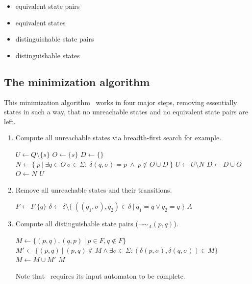 \begin{itemize}
	\item equivalent state pairs
	\item equivalent states
	\item distinguishable state pairs
	\item distinguishable states
\end{itemize}

\subsection{The minimization algorithm}

This minimization algorithm \MinAlg\ works in four major steps, removing essentially states in such a way, that no unreachable states and no equivalent state pairs are left.
\begin{enumerate}
	\item Compute all unreachable states via breadth-first search for example.
	
	\vspace{0.2cm}
	\begin{algorithmic}[1]
			\State $U \gets Q \setminus \{s\}$	
			\State $O \gets \{s\}$				
			\State $D \gets \{\}$				
				\State $N \gets \{\ p\ | \ \exists q \in O\ \sigma \in \Sigma \colon\ \delta(q, \sigma) = p\ \land\ p \notin O \cup D\ \}$
				\State $U \gets U \setminus N$
				\State $D \gets D \cup O$
				\State $O \gets N$
			\EndWhile
			\State \Return $U$
		\EndFunction
	\end{algorithmic}

	\item Remove all unreachable states and their transitions.
	
	\vspace{0.2cm}
	\begin{algorithmic}[1]
					\State $F \gets F \ \{q\}$
				\EndIf
				\State $\delta \gets \delta \setminus \{\ ((q_1, \sigma), q_2) \in \delta\ |\ q_1 = q \lor q_2 = q\ \}$
			\EndFor
			\State \Return $A$
		\EndFunction
	\end{algorithmic}

	\item Compute all distinguishable state pairs ($\neg \sim_A(p, q)$).
	
	\vspace{0.2cm}
	\begin{algorithmic}[1]
		 \label{ch:1:minmark}
		\State $M \gets \{ (p,q), (q,p)\ |\ p \in F, q \notin F \}$
		\Do
			\State $M' \gets \{ (p,q)\ |\ (p,q) \notin M \land \exists \sigma \in \Sigma \colon (\delta(p,\sigma), \delta(q,\sigma)) \in M \}$
			\State $M \gets M \cup M'$
		\State \Return $M$
		\EndFunction
	\end{algorithmic}
	Note that \CompDist\ requires its input automaton to be complete. 


\end{enumerate}

